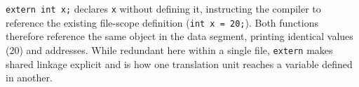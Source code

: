 
\texttt{extern int x;} declares \texttt{x} without defining it, instructing the
compiler to reference the existing file-scope definition (\texttt{int x = 20;}).
Both functions therefore reference the same object in the data segment, printing
identical values (20) and addresses. While redundant here within a single file,
\texttt{extern} makes shared linkage explicit and is how one translation unit
reaches a variable defined in another.

